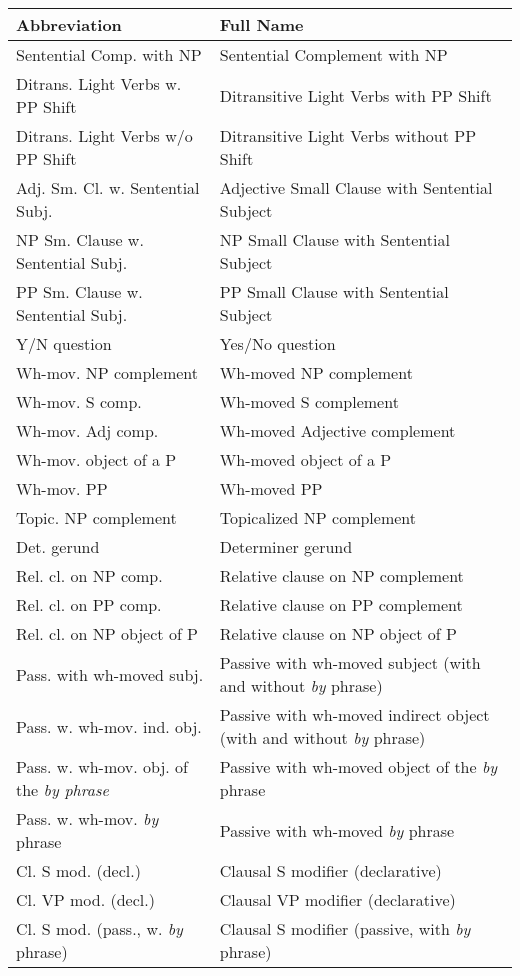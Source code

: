 \small
\begin{tabular}{ll}
Abbreviation&Full Name\\
\hline
Sentential Comp. with NP&Sentential Complement with NP\\
Ditrans. Light Verbs w. PP Shift&Ditransitive Light Verbs with PP Shift\\
Ditrans. Light Verbs w/o PP Shift&Ditransitive Light Verbs without PP Shift\\
Adj. Sm. Cl. w. Sentential Subj.&Adjective Small Clause with Sentential Subject\\
NP Sm. Clause w. Sentential Subj.&NP Small Clause with Sentential Subject\\
PP Sm. Clause w. Sentential Subj.&PP Small Clause with Sentential Subject\\
Y/N question&Yes/No question \\
Wh-mov. NP complement&Wh-moved NP complement \\
Wh-mov. S comp.&Wh-moved S complement \\
Wh-mov. Adj comp.&Wh-moved Adjective complement \\
Wh-mov. object of a P&Wh-moved object of a P \\
Wh-mov. PP&Wh-moved PP \\
Topic. NP complement&Topicalized NP complement \\
Det. gerund&Determiner gerund \\
Rel. cl. on NP comp.&Relative clause on NP complement \\
Rel. cl. on PP comp.& Relative clause on PP complement\\
Rel. cl. on NP object of P& Relative clause on NP object of P\\
Pass. with wh-moved subj.&Passive with wh-moved subject (with and without {\it by} phrase) \\
Pass. w. wh-mov. ind. obj.&Passive with wh-moved indirect object (with and without {\it by} phrase) \\
Pass. w. wh-mov. obj. of the {\it {\it by} phrase}&Passive with wh-moved object of the {\it by} phrase \\
Pass. w. wh-mov. {\it by} phrase&Passive with wh-moved {\it by} phrase \\
Cl. S mod. (decl.)&Clausal S modifier (declarative) \\
Cl. VP mod. (decl.)&Clausal VP modifier (declarative) \\
Cl. S mod. (pass., w. {\it by} phrase)&Clausal S modifier (passive, with {\it by} phrase) \\

\end{tabular}
